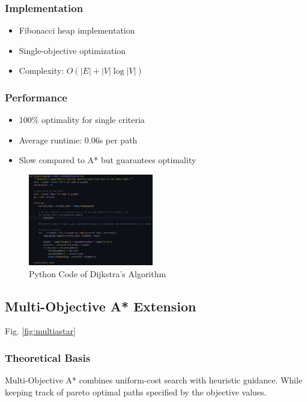 \documentclass[conference]{IEEEtran}
\begin{document}
\subsubsection{Implementation}
\begin{itemize}
    \item Fibonacci heap implementation
    \item Single-objective optimization
    \item Complexity: $O(|E| + |V|\log|V|)$
\end{itemize}

\subsubsection{Performance}
\begin{itemize}
    \item 100\% optimality for single criteria
    \item Average runtime: 0.06s per path
    \item Slow compared to A* but guarantees optimality
\end{itemize}

\begin{figure}[htbp]
    \centering
    \includegraphics[width=0.486\textwidth]{dijkstra.png} %
    \caption{Python Code of Dijkstra's Algorithm}
    \label{fig:dijkstra}
\end{figure}

\subsection{Multi-Objective A* Extension}
Fig. \ref{fig:multiastar}
\subsubsection{Theoretical Basis}
Multi-Objective A* combines uniform-cost search with heuristic guidance. While keeping track of pareto optimal paths specified by the objective values.
\end{document}
